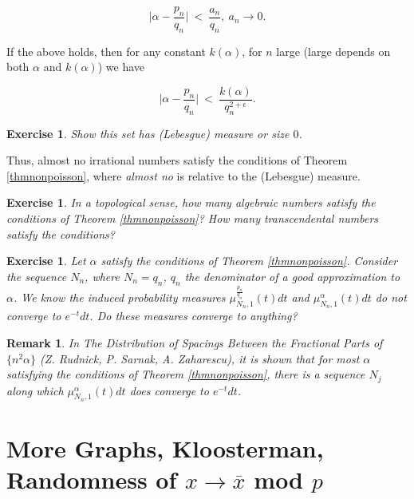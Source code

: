 \documentclass[12pt,letterpaper]{report}
\newcommand\be{\begin{equation}}
\newcommand\ee{\end{equation}}
\newtheorem{exe}[thm]{Exercise}
\newtheorem{rek}[thm]{Remark}
\newcommand{\pn}{p_n}
\newcommand{\qn}{q_n}
\begin{document}
\be \Big| \alpha - \frac{\pn}{\qn} \Big| \ < \ \frac{a_n}{\qn}, \
a_n \to 0. \ee

If the above holds, then for any constant $k(\alpha)$, for $n$
large (large depends on both $\alpha$ and $k(\alpha)$) we have

\be \Big| \alpha - \frac{\pn}{\qn} \Big| \ < \
\frac{k(\alpha)}{\qn^{2+\epsilon}}. \ee

\begin{exe} Show this set has
(Lebesgue) measure or size $0$.
\end{exe}

Thus, almost no irrational numbers satisfy the conditions of
Theorem \ref{thmnonpoisson}, where \emph{almost no} is relative to
the (Lebesgue) measure.

\begin{exe} In a topological sense, how many algebraic numbers
satisfy the conditions of Theorem \ref{thmnonpoisson}? How many
transcendental numbers satisfy the conditions? \end{exe}

\begin{exe} Let $\alpha$ satisfy the conditions of Theorem
\ref{thmnonpoisson}. Consider the sequence $N_n$, where $N_n =
\qn$, $\qn$ the denominator of a good approximation to $\alpha$.
We know the induced probability measures
$\mu_{N_n,1}^{\frac{\pn}{\qn}}(t)dt$ and
$\mu_{N_n,1}^{\alpha}(t)dt$ do not converge to $e^{-t}dt$. Do
these measures converge to anything?
\end{exe}

\begin{rek} In \emph{The Distribution of Spacings Between the Fractional
Parts of $\{n^2 \alpha\}$} (Z. Rudnick, P. Sarnak, A. Zaharescu),
it is shown that for most $\alpha$ satisfying the conditions of
Theorem \ref{thmnonpoisson}, there \emph{is} a sequence $N_j$
along which $\mu_{N_n,1}^{\alpha}(t)dt$ \emph{does} converge to
$e^{-t}dt$.
\end{rek}






\chapter{More Graphs, Kloosterman, Randomness of $x \to \overline{x}$ mod $p$}
\end{document}
